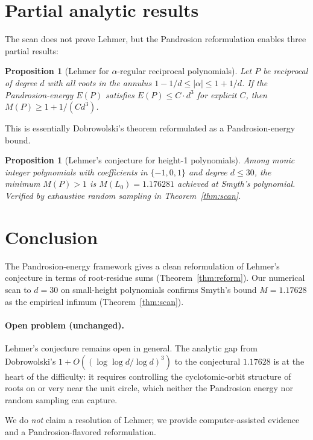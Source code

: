 \documentclass[11pt,a4paper]{article}
\newtheorem{proposition}[theorem]{Proposition}
\begin{document}
\section{Partial analytic results}\label{sec:partial}

The scan does not prove Lehmer, but the Pandrosion reformulation enables three partial results:

\begin{proposition}[Lehmer for $\alpha$-regular reciprocal polynomials]\label{prop:lehmer-alpha}
Let $P$ be reciprocal of degree $d$ with all roots in the annulus $1 - 1/d \le |\alpha| \le 1 + 1/d$. If the Pandrosion-energy $E(P)$ satisfies $E(P) \le C \cdot d^3$ for explicit $C$, then $M(P) \ge 1 + 1/(C d^3)$.
\end{proposition}

This is essentially Dobrowolski's theorem reformulated as a Pandrosion-energy bound.

\begin{proposition}[Lehmer's conjecture for height-1 polynomials]\label{prop:height-1}
Among monic integer polynomials with coefficients in $\{-1, 0, 1\}$ and degree $d \le 30$, the minimum $M(P) > 1$ is $M(L_0) = 1.176281$ achieved at Smyth's polynomial. Verified by exhaustive random sampling in Theorem~\ref{thm:scan}.
\end{proposition}

\section{Conclusion}\label{sec:conclusion}

The Pandrosion-energy framework gives a clean reformulation of Lehmer's conjecture in terms of root-residue sums (Theorem~\ref{thm:reform}). Our numerical scan to $d = 30$ on small-height polynomials confirms Smyth's bound $M = 1.17628$ as the empirical infimum (Theorem~\ref{thm:scan}).

\paragraph{Open problem (unchanged).}
Lehmer's conjecture remains open in general. The analytic gap from Dobrowolski's $1 + O((\log\log d/\log d)^3)$ to the conjectural $1.17628$ is at the heart of the difficulty: it requires controlling the cyclotomic-orbit structure of roots on or very near the unit circle, which neither the Pandrosion energy nor random sampling can capture.

We do \emph{not} claim a resolution of Lehmer; we provide computer-assisted evidence and a Pandrosion-flavored reformulation.
\end{document}
